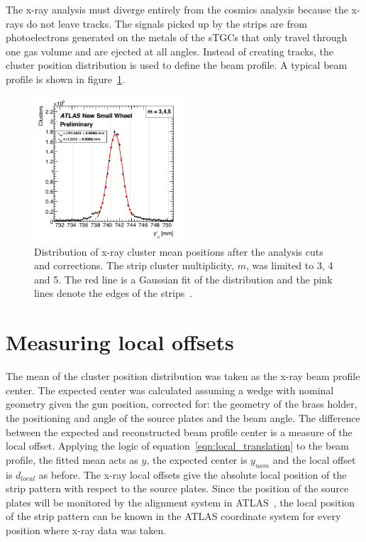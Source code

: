 The x-ray analysis must diverge entirely from the cosmics analysis because the x-rays do not leave tracks. The signals picked up by the strips are from photoelectrons generated on the metals of the sTGCs that only travel through one gas volume and are ejected at all angles. Instead of creating tracks, the cluster position distribution is used to define the beam profile. A typical beam profile is shown in figure~\ref{fig:xray_beam_profile}.

\begin{figure}
    \centering
    \includegraphics[width = 0.5\textwidth]{figures/figure_xray_beam_profile.pdf}
    \caption{Distribution of x-ray cluster mean positions after the analysis cuts and corrections. The strip cluster multiplicity, $m$, was limited to 3, 4 and 5. The red line is a Gaussian fit of the distribution and the pink lines denote the edges of the strips~\cite{lefebvre_precision_2020}.}
    \label{fig:xray_beam_profile}
\end{figure}

\section{Measuring local offsets}
The mean of the cluster position distribution was taken as the x-ray beam profile center. The expected center was calculated assuming a wedge with nominal geometry given the gun position, corrected for: the geometry of the brass holder, the positioning and angle of the source plates and the beam angle. The difference between the expected and reconstructed beam profile center is a measure of the local offset. Applying the logic of equation~\ref{eqn:local_translation} to the beam profile, the fitted mean acts as $y$, the expected center is $y_{nom}$ and the local offset is $d_{local}$ as before. The x-ray local offsets  give the absolute local position of the strip pattern with respect to the source plates. Since the position of the source plates will be monitored by the alignment system in ATLAS~\cite{nsw_tdr}, the local position of the strip pattern can be known in the ATLAS coordinate system for every position where x-ray data was taken.

